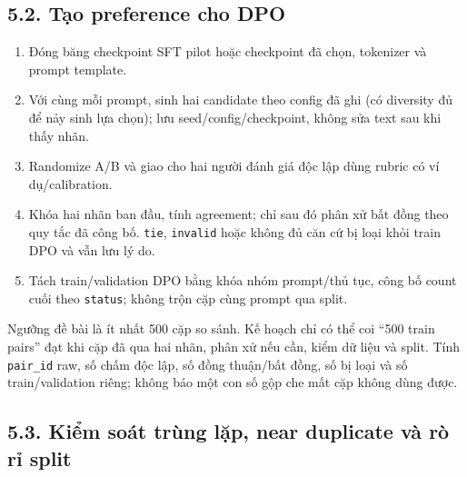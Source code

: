 \documentclass[11pt,a4paper]{article}
\providecommand{\tightlist}{\setlength{\itemsep}{0pt}\setlength{\parskip}{0pt}}
\begin{document}
\subsection{5.2. Tạo preference cho
DPO}\label{tux1ea1o-preference-cho-dpo}

\begin{enumerate}
\def\labelenumi{\arabic{enumi}.}
\tightlist
\item
  Đóng băng checkpoint SFT pilot hoặc checkpoint đã chọn, tokenizer và
  prompt template.
\item
  Với cùng mỗi prompt, sinh hai candidate theo config đã ghi (có
  diversity đủ để nảy sinh lựa chọn); lưu seed/config/checkpoint, không
  sửa text sau khi thấy nhãn.
\item
  Randomize A/B và giao cho hai người đánh giá độc lập dùng rubric có ví
  dụ/calibration.
\item
  Khóa hai nhãn ban đầu, tính agreement; chỉ sau đó phân xử bất đồng
  theo quy tắc đã công bố. \nolinkurl{tie}, \nolinkurl{invalid} hoặc
  không đủ căn cứ bị loại khỏi train DPO và vẫn lưu lý do.
\item
  Tách train/validation DPO bằng khóa nhóm prompt/thủ tục, công bố count
  cuối theo \nolinkurl{status}; không trộn cặp cùng prompt qua split.
\end{enumerate}

Ngưỡng đề bài là ít nhất 500 cặp so sánh. Kế hoạch chỉ có thể coi ``500
train pairs'' đạt khi cặp đã qua hai nhãn, phân xử nếu cần, kiểm dữ liệu
và split. Tính \nolinkurl{pair_id} raw, số chấm độc lập, số đồng
thuận/bất đồng, số bị loại và số train/validation riêng; không báo một
con số gộp che mất cặp không dùng được.

\subsection{5.3. Kiểm soát trùng lặp, near duplicate và rò rỉ
split}\label{kiux1ec3m-souxe1t-truxf9ng-lux1eb7p-near-duplicate-vuxe0-ruxf2-rux1ec9-split}
\end{document}

